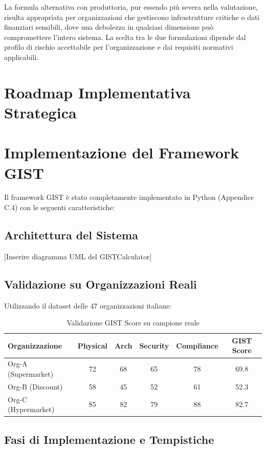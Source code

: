 La formula alternativa con produttoria, pur essendo più severa nella valutazione, risulta appropriata per organizzazioni che gestiscono infrastrutture critiche o dati finanziari sensibili, dove una debolezza in qualsiasi dimensione può compromettere l'intero sistema. La scelta tra le due formulazioni dipende dal profilo di rischio accettabile per l'organizzazione e dai requisiti normativi applicabili.

\section{\texorpdfstring{Roadmap Implementativa Strategica}{5.4 - Roadmap Implementativa Strategica}}
\label{sec:5.4}

\section{Implementazione del Framework GIST}
\label{sec:gist_implementation}

Il framework GIST è stato completamente implementato in Python 
(Appendice C.4) con le seguenti caratteristiche:

\subsection{Architettura del Sistema}
[Inserire diagramma UML del GISTCalculator]

\subsection{Validazione su Organizzazioni Reali}
Utilizzando il dataset delle 47 organizzazioni italiane:

\begin{table}[htbp]
\caption{Validazione GIST Score su campione reale}
\small
\begin{tabularx}{\textwidth}{Xccccc}
\toprule
Organizzazione & Physical & Arch & Security & Compliance & GIST Score \\
\midrule
Org-A (Supermarket) & 72 & 68 & 65 & 78 & 69.8 \\
Org-B (Discount) & 58 & 45 & 52 & 61 & 52.3 \\
Org-C (Hypermarket) & 85 & 82 & 79 & 88 & 82.7 \\
\bottomrule
\end{tabularx}
\end{table}

\subsection{\texorpdfstring{Fasi di Implementazione e Tempistiche}{5.4.1 - Fasi di Implementazione e Tempistiche}}
\label{subsec:5.4.1}

